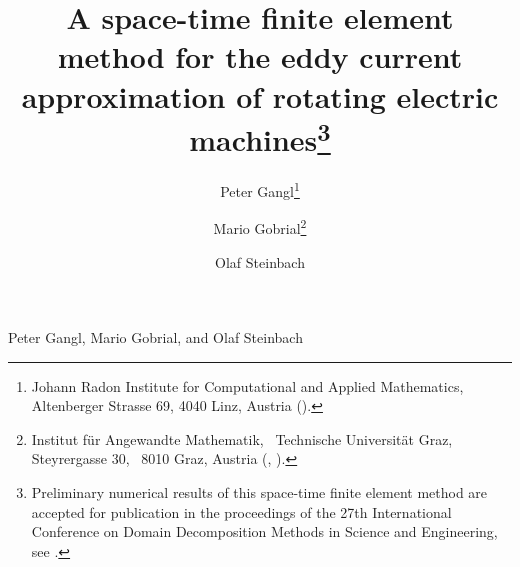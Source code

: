   \title{A space-time finite element method for the eddy current
    approximation of rotating electric machines\footnote{P\lowercase{reliminary numerical results of this space-time finite element method are
accepted for publication in the proceedings of the 27th} I\lowercase{nternational }C\lowercase{onference
on }D\lowercase{omain }D\lowercase{ecomposition }M\lowercase{ethods in }S\lowercase{cience and }E\lowercase{ngineering, see \cite{GaGoSt23}}.}}
\author{Peter Gangl\thanks{Johann Radon Institute for Computational and
    Applied Mathematics, Altenberger Strasse 69, 4040 Linz, Austria
    ().}
  \and Mario Gobrial\thanks{Institut f\"{u}r Angewandte Mathematik, \,
    Technische Universit\"{a}t Graz, \, Steyrergasse 30, \, 8010 Graz, Austria
    (, ).}
\and Olaf Steinbach\footnotemark[3]}

{Peter Gangl, Mario Gobrial, and Olaf Steinbach}
